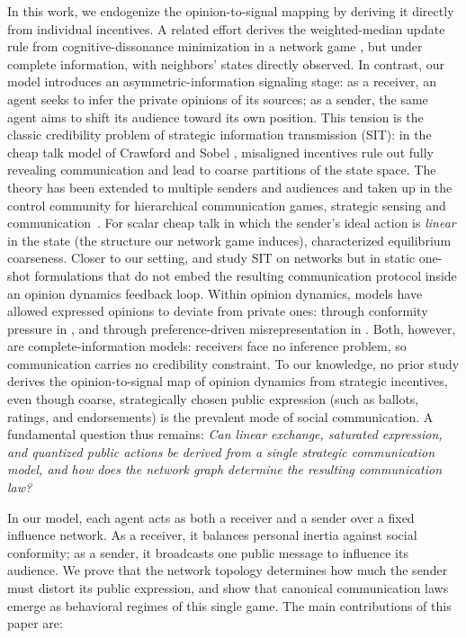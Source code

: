 \documentclass[journal,twoside,web]{ieeecolor}
\begin{document}
In this work, we endogenize the opinion-to-signal mapping by deriving it directly from individual incentives. A related effort derives the weighted-median update rule from cognitive-dissonance minimization in a network game \cite{mei2022micro}, but under complete information, with neighbors' states directly observed.
In contrast, our model introduces an asymmetric-information signaling stage: as a receiver, an agent seeks to infer the private opinions of its sources; as a sender, the same agent aims to shift its audience toward its own position. This tension is the classic credibility problem of strategic information transmission (SIT): in the cheap talk model of Crawford and Sobel \cite{crawford1982strategic}, misaligned incentives rule out fully revealing communication and lead to coarse partitions of the state space. The theory has been extended to multiple senders and audiences \cite{krishna2001model,battaglini2002multiple,farrell1989cheap,goltsman2011how} and taken up in the control community for hierarchical communication games, strategic sensing and communication~\cite{akyol2017information,farokhi2017estimation,saritas2017quadratic,kazikli2022signaling}. For scalar cheap talk in which the sender's ideal action is \emph{linear} in the state (the structure our network game induces), \cite{melumad1991communication,gordon2010on} characterized equilibrium coarseness. Closer to our setting, \cite{hagenbach2010strategic} and \cite{galeotti2013strategic} study SIT on networks but in static one-shot formulations that do not embed the resulting communication protocol inside an opinion dynamics feedback loop.
Within opinion dynamics, models have allowed expressed opinions to deviate from private ones: through conformity pressure in \cite{ye2019influence}, and through preference-driven misrepresentation in \cite{buechel2015opinion}. Both, however, are complete-information models: receivers face no inference problem, so communication carries no credibility constraint.
To our knowledge, no prior study derives the opinion-to-signal map of opinion dynamics from strategic incentives, even though coarse, strategically chosen public expression (such as ballots, ratings, and endorsements) is the prevalent mode of social communication. A fundamental question thus remains: \emph{Can linear exchange, saturated expression, and quantized public actions be derived from a single strategic communication model, and how does the network graph determine the resulting communication law?}

In our model, each agent acts as both a receiver and a sender over a fixed influence network. As a receiver, it balances personal inertia against social conformity; as a sender, it broadcasts one public message to influence its audience. We prove that the network topology determines how much the sender must distort its public expression, and show that canonical communication laws emerge as behavioral regimes of this single game. The main contributions of this paper are:
\end{document}
